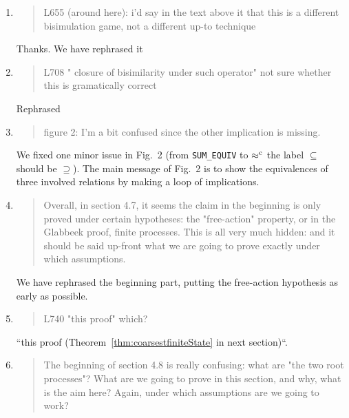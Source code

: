 \begin{enumerate}
\item \begin{quote}
    L655 (around here): i'd say in the text above it that this is a
    different bisimulation game, not a different up-to technique
  \end{quote}
  Thanks. We have rephrased it 
\item \begin{quote}
    L708 " closure of bisimilarity under such operator" not sure whether this is gramatically correct
  \end{quote}
  Rephrased

\item \begin{quote}
    figure 2: I'm a bit confused since the other implication is missing. 
  \end{quote}
  We fixed one minor issue in Fig.~2 (from \texttt{SUM_EQUIV} to
  $\mathrel{\approx^{\rm{c}}}$ the label $\subseteq$ should be $\supseteq$). The main
  message of Fig.~2 is to show the equivalences of three involved
  relations by making a loop of implications.
  
\item \begin{quote}
    Overall, in section 4.7, it seems the claim in the beginning is
    only proved under certain hypotheses: the "free-action" property,
    or in the Glabbeek proof, finite processes. This is all very much
    hidden: and it should be said up-front what we are going to prove
    exactly under which assumptions.
  \end{quote}

  We have rephrased the beginning part, putting the free-action
  hypothesis as early as possible.
  
\item \begin{quote}
    L740 "this proof" which? 
  \end{quote}

  ``this proof (Theorem~\ref{thm:coarsestfiniteState} in next
  section)``.
  
\item \begin{quote}
    The beginning of section 4.8 is really confusing: what are "the
    two root processes"? What are we going to prove in this section,
    and why, what is the aim here? Again, under which assumptions are
    we going to work?
  \end{quote}


\end{enumerate}
